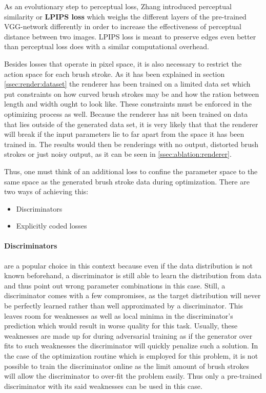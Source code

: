 As an evolutionary step to perceptual loss, Zhang \etal \cite{lpips} introduced 
perceptual similarity or \textbf{LPIPS loss} which weighs the different layers of
the pre-trained VGG-network differently in order to increase the effectiveness of
perceptual distance between two images.
LPIPS loss is meant to preserve edges even better than perceptual loss does with
a similar computational overhead.

Besides losses that operate in pixel space, it is also necessary to restrict the
action space for each brush stroke.
As it has been explained in section \ref{ssec:render:dataset} the renderer has been
trained on a limited data set which put constraints on how curved brush strokes may
be and how the ration between length and width ought to look like.
These constraints must be enforced in the optimizing process as well.
Because the renderer has nit been trained on data that lies outside of the generated
data set, it is very likely that that the renderer will break if the input parameters
lie to far apart from the space it has been trained in.
The results would then be renderings with no output, distorted brush strokes or just
noisy output, as it can be seen in \ref{ssec:ablation:renderer}.

Thus, one must think of an additional loss to confine the parameter space to the same
space as the generated brush stroke data during optimization.
There are two ways of achieving this:
\begin{itemize}
    \item Discriminators
    \item Explicitly coded losses
\end{itemize}

\paragraph{Discriminators} are a popular choice in this context because even if the
data distribution is not known beforehand, a discriminator is still able to learn
the distribution from data and thus point out wrong parameter combinations in this
case.
Still, a discriminator comes with a few compromises, as the target distribution will
never be perfectly learned rather than well approximated by a discriminator.
This leaves room for weaknesses as well as local minima in the discriminator's prediction
which would result in worse quality for this task.
Usually, these weaknesses are made up for during adversarial training as if the generator
over fits to such weaknesses the discriminator will quickly penalize such a solution.
In the case of the optimization routine which is employed for this problem, it is
not possible to train the discriminator online as the limit amount of brush strokes
will allow the discriminator to over-fit the problem easily.
Thus only a pre-trained discriminator with its said weaknesses can be used in this
case.

